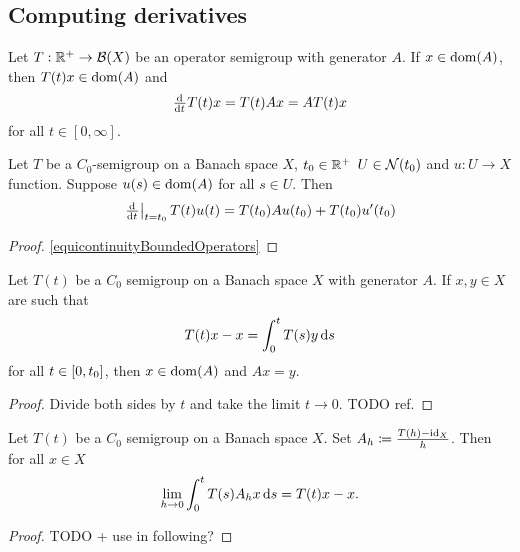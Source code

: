 \subsection{Computing derivatives}
\begin{lemma} \label{differentialOperatorSemigroupGenerator}
Let $T: \mathbb{R}^+\to \operatorname{\mathcal{B}}(X)$ be an operator semigroup with generator $A$. If $x\in\operatorname{dom}(A)$, then $T(t)x\in\operatorname{dom}(A)$ and
\[ \od{}{t}T(t)x = T(t)Ax = AT(t)x \]
for all $t\in [0,\infty]$.
\end{lemma}

\begin{lemma}
Let $T$ be a $C_0$-semigroup on a Banach space $X$, $t_0\in\mathbb{R}^+$ $U\in\operatorname{\mathcal{N}}(t_0)$ and $u: U \to X$ function. Suppose $u(s) \in \operatorname{dom}(A)$ for all $s\in U$. Then
\[ \left.\od{}{t}\right|_{t=t_0}T(t)u(t) = T(t_0)Au(t_0) + T(t_0)u'(t_0) \]
\end{lemma}
\begin{proof}
\ref{equicontinuityBoundedOperators}
\end{proof}

\begin{lemma} \label{domainGeneratorLemma}
Let $T(t)$ be a $C_0$ semigroup on a Banach space $X$ with generator $A$. If $x,y\in X$ are such that
\[ T(t)x-x = \int_0^tT(s)y\operatorname{d \!}{s} \]
for all $t\in\interval{0,t_0}$, then $x\in\operatorname{dom}(A)$ and $Ax = y$.
\end{lemma}
\begin{proof}
Divide both sides by $t$ and take the limit $t\to 0$. TODO ref.
\end{proof}

\begin{lemma} \label{convergenceGeneratorUnderIntegral}
Let $T(t)$ be a $C_0$ semigroup on a Banach space $X$. Set $A_h \coloneqq \frac{T(h) - \operatorname{id}_X}{h}$. Then for all $x\in X$
\[ \lim_{h\to 0}\int_0^t T(s)A_hx\operatorname{d \!}{s} = T(t)x-x. \]
\end{lemma}
\begin{proof}
TODO + use in following?
\end{proof}

